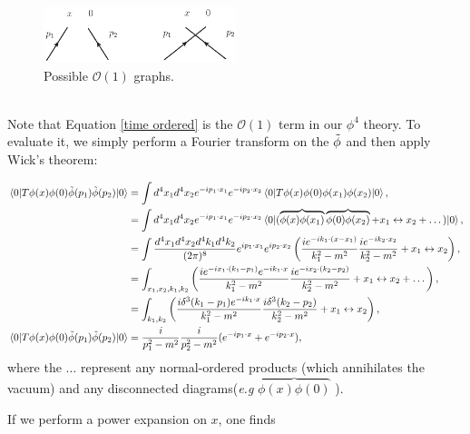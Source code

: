 \documentclass{article}
\begin{document}
\begin{figure}[H]
\centering
\includegraphics*[width=0.5\textwidth]{Graphs/Fig1011a.eps}
\caption{Possible $\mathcal{O}(1)$ graphs. }
\label{fig:10.1.1}
\end{figure}\\

Note that Equation \ref{time ordered} is the $\mathcal{O}(1)$ term in our $\phi^4$ theory. To evaluate it, we simply perform a Fourier transform on the $\Tilde{\phi}$ and then apply Wick's theorem:

\begin{equation}
    \begin{split}
        \mel{0}{T\phi(x)\phi(0)\Tilde{\phi}(p_1)\Tilde{\phi}(p_2)}{0}&=\int d^4x_1d^4x_2 e^{-ip_1\cdot x_1}e^{-ip_2\cdot x_2}\mel{0}{T\phi(x)\phi(0)\phi(x_1)\phi(x_2)}{0},\\
        &=\int d^4x_1d^4x_2 e^{-ip_1\cdot x_1}e^{-ip_2\cdot x_2}\mel{0}{(\overbrace{\phi(x)\phi(x_1)}\overbrace{\phi(0)\phi(x_2)} + x_1\leftrightarrow x_2 + \dots)}{0},\\
        &= \int \frac{d^4x_1d^4x_2d^4k_1d^4k_2}{(2\pi)^8} e^{ip_1\cdot x_1}e^{ip_2\cdot x_2} \left(\frac{ie^{-ik_1\cdot (x-x_1)}}{k_1^2-m^2}\frac{ie^{-ik_2\cdot x_2}}{k_2^2-m^2}+ x_1\leftrightarrow x_2 \right),\\
        &= \int_{x_1,x_2,k_1,k_2}  \left(\frac{ie^{-ix_1\cdot (k_1-p_1)}e^{-ik_1\cdot x}}{k_1^2-m^2}\frac{ie^{-ix_2\cdot (k_2-p_2)}}{k_2^2-m^2}+ x_1\leftrightarrow x_2 + \dots\right),\\
        &= \int_{k_1,k_2}  \left(\frac{i\delta^3(k_1-p_1)e^{-ik_1\cdot x}}{k_1^2-m^2}\frac{i\delta^3(k_2-p_2)}{k_2^2-m^2}+ x_1\leftrightarrow x_2 \right),\\
        \mel{0}{T\phi(x)\phi(0)\Tilde{\phi}(p_1)\Tilde{\phi}(p_2)}{0}&= \frac{i}{p_1^2-m^2}\frac{i}{p_2^2-m^2}(e^{-ip_1\cdot x}+e^{-ip_2\cdot x}),\\
    \end{split}
\end{equation}
where the $\dots$ represent any normal-ordered products (which annihilates the vacuum) and any disconnected diagrams(\textit{e.g} $\overbrace{\phi(x)\phi(0)}$ ).

If we perform a power expansion on $x$, one finds
\end{document}
